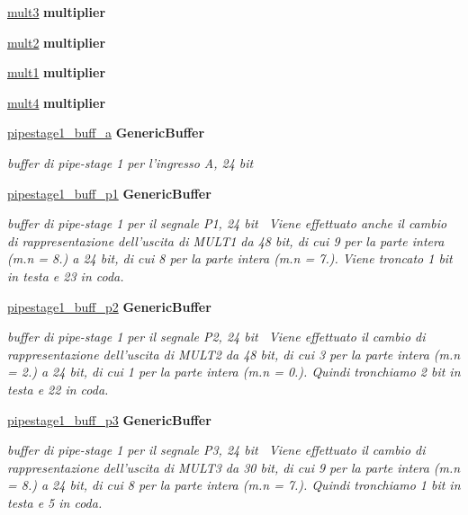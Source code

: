 \begin{DoxyCompactItemize}
\hyperlink{class_linear_regression_1_1_structural_adf80c8ef67f9eb716830cfb9a6d3a980}{mult3}  {\bfseries multiplier}   
\item 
\hyperlink{class_linear_regression_1_1_structural_a7c5c7b6fb03b66e49b0eb767162f01a8}{mult2}  {\bfseries multiplier}   
\item 
\hyperlink{class_linear_regression_1_1_structural_abe2dbada52541335e367815bffe06c28}{mult1}  {\bfseries multiplier}   
\item 
\hyperlink{class_linear_regression_1_1_structural_a65ae62ab3b1e6675bf4e4bcf572d2025}{mult4}  {\bfseries multiplier}   
\item 
\hyperlink{class_linear_regression_1_1_structural_a273de05d7892fd1febb31d1c6fab5120}{pipestage1\+\_\+buff\+\_\+a}  {\bfseries Generic\+Buffer}   
\begin{DoxyCompactList}\small\item\em buffer di pipe-\/stage 1 per l'ingresso A, 24 bit~\newline
 \end{DoxyCompactList}\item 
\hyperlink{class_linear_regression_1_1_structural_aa4ecb297c24eee090576a63597934c3c}{pipestage1\+\_\+buff\+\_\+p1}  {\bfseries Generic\+Buffer}   
\begin{DoxyCompactList}\small\item\em buffer di pipe-\/stage 1 per il segnale P1, 24 bit~\newline
 Viene effettuato anche il cambio di rappresentazione dell'uscita di M\+U\+L\+T1 da 48 bit, di cui 9 per la parte intera (m.\+n = 8.) a 24 bit, di cui 8 per la parte intera (m.\+n = 7.). Viene troncato 1 bit in testa e 23 in coda. \end{DoxyCompactList}\item 
\hyperlink{class_linear_regression_1_1_structural_a9cb3bc10f620d667a657ecca4aa0b59a}{pipestage1\+\_\+buff\+\_\+p2}  {\bfseries Generic\+Buffer}   
\begin{DoxyCompactList}\small\item\em buffer di pipe-\/stage 1 per il segnale P2, 24 bit~\newline
 Viene effettuato il cambio di rappresentazione dell'uscita di M\+U\+L\+T2 da 48 bit, di cui 3 per la parte intera (m.\+n = 2.) a 24 bit, di cui 1 per la parte intera (m.\+n = 0.). Quindi tronchiamo 2 bit in testa e 22 in coda. \end{DoxyCompactList}\item 
\hyperlink{class_linear_regression_1_1_structural_a561aaea076fe5b5174fc967b43b9a50b}{pipestage1\+\_\+buff\+\_\+p3}  {\bfseries Generic\+Buffer}   
\begin{DoxyCompactList}\small\item\em buffer di pipe-\/stage 1 per il segnale P3, 24 bit~\newline
 Viene effettuato il cambio di rappresentazione dell'uscita di M\+U\+L\+T3 da 30 bit, di cui 9 per la parte intera (m.\+n = 8.) a 24 bit, di cui 8 per la parte intera (m.\+n = 7.). Quindi tronchiamo 1 bit in testa e 5 in coda. \end{DoxyCompactList}\end{DoxyCompactItemize}



